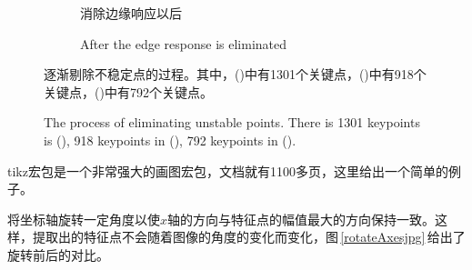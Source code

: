 \documentclass[10.5pt,a4paper]{article}
\numberwithin{equation}{section}
\numberwithin{figure}{section}
\numberwithin{table}{section}
\renewcommand{\figurename}{图}
\begin{document}
\begin{figure}[htbp]
\begin{subfigure}[b]{.4\textwidth}
				\caption{消除边缘响应以后\label{withEdgeElimit}}
				\addtocounter{subfigure}{-1}
				\caption{After the edge response is eliminated\vspace{1.5em}}
	\end{subfigure}
\caption{逐渐剔除不稳定点的过程。其中，()中有1301个关键点，()中有918个关键点，()中有792个关键点。\label{compareThresholdAndEdgeResponse}}
\addtocounter{figure}{-1}
\renewcommand{\figurename}{Figure}
\caption{The process of eliminating unstable points. There is 1301 keypoints is (), 918 keypoints in
(), 792 keypoints in ().}
\end{figure}
\par
tikz宏包是一个非常强大的画图宏包，文档就有1100多页，这里给出一个简单的例子。\par
将坐标轴旋转一定角度以使$x$轴的方向与特征点的幅值最大的方向保持一致。这样，提取出的特征点不会随着图像的角度的变化而变化，图\,\ref{rotateAxesjpg}\,给出了旋转前后的对比。
\end{document}
